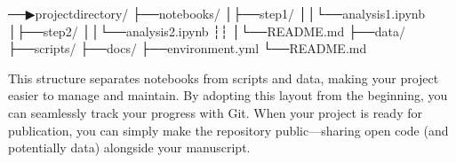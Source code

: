 \documentclass[letterpaper,10pt,english]{jupyterBook}
\begin{document}
\begin{sphinxVerbatim}[commandchars=\\\{\}]
──▶project\PYGZus{}directory/
├──notebooks/
│├──step\PYGZus{}1/
││└──analysis\PYGZus{}1.ipynb
│├──step\PYGZus{}2/
││└──analysis\PYGZus{}2.ipynb
┆┆
│└──README.md
├──data/
├──scripts/
├──docs/
├──environment.yml
└──README.md
\end{sphinxVerbatim}

\sphinxAtStartPar
This structure separates notebooks from scripts and data, making your project easier to manage and maintain. By adopting this layout from the beginning, you can seamlessly track your progress with Git. When your project is ready for publication, you can simply make the repository public—sharing open code (and potentially data) alongside your manuscript.
\end{document}
